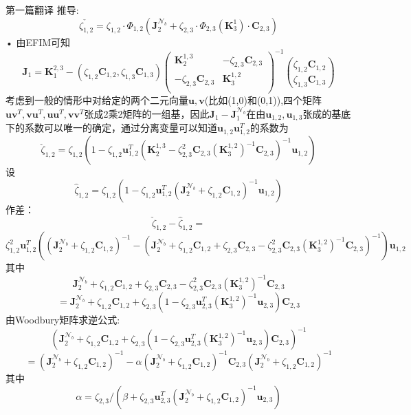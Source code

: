 \documentclass[12pt]{article}
\theoremstyle{remark}
\begin{document}
第一篇翻译
推导:
\begin{equation}
\check{\zeta_{1,2}}=\zeta_{1,2} \cdot \Phi_{1,2}(\bm{J}_2^{\mathcal{N}_b}+\zeta_{2,3} \cdot \Phi_{2,3}(\bm{K}_3^{1})\cdot \bm{C}_{2,3})
\end{equation}•
由EFIM可知
\begin{equation}
\bm{J}_1=\bm{K}_1^{2,3}-(\zeta_{1,2}\bm{C}_{1,2},\zeta_{1,3}\bm{C}_{1,3})\left(
\begin{array}{cc}
\bm{K}_2^{1,3} & -\zeta_{2,3}\bm{C}_{2,3}\\
-\zeta_{2,3}\bm{C}_{2,3} & \bm{K}_3^{1,2}\\
\end{array}
\right)^{-1}\binom{\zeta_{1,2}\bm{C}_{1,2}}{\zeta_{1,3}\bm{C}_{1,3}}
\end{equation}
考虑到一般的情形中对给定的两个二元向量$\bm{u},\bm{v}$(比如(1,0)和(0,1)),四个矩阵$\bm{u}\bm{v}^T,\bm{v}\bm{u}^T,\bm{u}\bm{u}^T,\bm{v}\bm{v}^T$张成2乘2矩阵的一组基，因此$\bm{J}_1-\bm{J}_1^{\mathcal{N}_b}$在由$\bm{u}_{1,2},\bm{u}_{1,3}$张成的基底下的系数可以唯一的确定，通过分离变量可以知道$\bm{u}_{1,2}\bm{u}_{1,2}^T$的系数为
\begin{equation}
\check{\zeta}_{1,2}=\zeta_{1,2}(1-\zeta_{1,2}\bm{u}_{1,2}^T(\bm{K}_2^{1,3}-\zeta^2_{2,3}\bm{C}_{2,3}
(\bm{K}_3^{1,2})^{-1}\bm{C}_{2,3})^{-1}\bm{u}_{1,2})
\end{equation}
设\[
\hat{\zeta}_{1,2}=\zeta_{1,2}(1-\zeta_{1,2}\bm{u}_{1,2}^T(\bm{J}_2^{\mathcal{N}_b}+\zeta_{1,2}\bm{C}_{1,2})^{-1}\bm{u}_{1,2})
\]
作差：
\[
\check{\zeta}_{1,2}-\hat{\zeta}_{1,2}=
\]
\[\zeta_{1,2}^2\bm{u}_{1,2}^T((\bm{J}_2^{\mathcal{N}_b}+\zeta_{1,2}\bm{C}_{1,2})^{-1}-(\bm{J}_2^{\mathcal{N}_b}+\zeta_{1,2}\bm{C}_{1,2}+\zeta_{2,3}\bm{C}_{2,3}-\zeta^2_{2,3}\bm{C}_{2,3}
(\bm{K}_3^{1,2})^{-1}\bm{C}_{2,3})^{-1})\bm{u}_{1,2}
\]
其中
\[
\bm{J}_2^{\mathcal{N}_b}+\zeta_{1,2}\bm{C}_{1,2}+\zeta_{2,3}\bm{C}_{2,3}-\zeta^2_{2,3}\bm{C}_{2,3}
(\bm{K}_3^{1,2})^{-1}\bm{C}_{2,3}
\]
\[
=\bm{J}_2^{\mathcal{N}_b}+\zeta_{1,2}\bm{C}_{1,2}+\zeta_{2,3}(1-\zeta_{2,3}\bm{u}_{2,3}^T(\bm{K}_3^{1,2})^{-1}\bm{u}_{2,3})\bm{C}_{2,3}
\]
由Woodbury矩阵求逆公式:
\[
(\bm{J}_2^{\mathcal{N}_b}+\zeta_{1,2}\bm{C}_{1,2}+\zeta_{2,3}(1-\zeta_{2,3}\bm{u}_{2,3}^T(\bm{K}_3^{1,2})^{-1}\bm{u}_{2,3})\bm{C}_{2,3}
)^{-1}
\]
\[
=(\bm{J}_2^{\mathcal{N}_b}+\zeta_{1,2}\bm{C}_{1,2})^{-1}-\alpha(\bm{J}_2^{\mathcal{N}_b}+\zeta_{1,2}\bm{C}_{1,2})^{-1}\bm{C}_{2,3}(\bm{J}_2^{\mathcal{N}_b}+\zeta_{1,2}\bm{C}_{1,2})^{-1}
\]
其中
\[
\alpha=\zeta_{2,3}/(\beta+\zeta_{2,3}\bm{u}_{2,3}^T(\bm{J}_2^{\mathcal{N}_b}+\zeta_{1,2}\bm{C}_{1,2})^{-1}\bm{u}_{2,3})
\]
\end{document}
